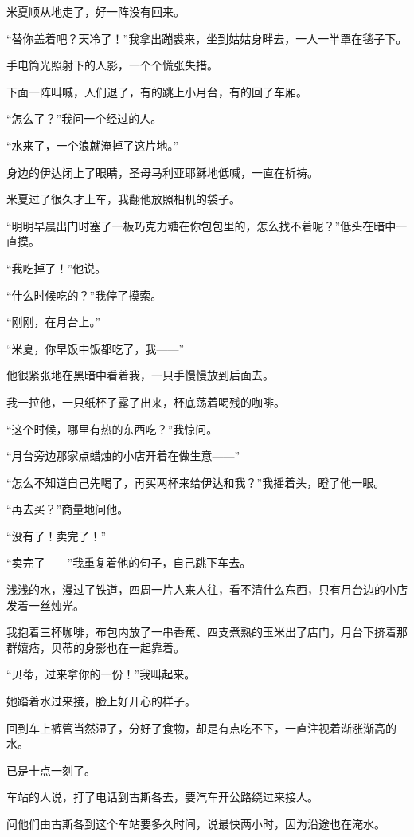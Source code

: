 \par 米夏顺从地走了，好一阵没有回来。
\par “替你盖着吧？天冷了！”我拿出蹦裘来，坐到姑姑身畔去，一人一半罩在毯子下。
\par 手电筒光照射下的人影，一个个慌张失措。
\par 下面一阵叫喊，人们退了，有的跳上小月台，有的回了车厢。
\par “怎么了？”我问一个经过的人。
\par “水来了，一个浪就淹掉了这片地。”
\par 身边的伊达闭上了眼睛，圣母马利亚耶稣地低喊，一直在祈祷。
\par 米夏过了很久才上车，我翻他放照相机的袋子。
\par “明明早晨出门时塞了一板巧克力糖在你包包里的，怎么找不着呢？”低头在暗中一直摸。
\par “我吃掉了！”他说。
\par “什么时候吃的？”我停了摸索。
\par “刚刚，在月台上。”
\par “米夏，你早饭中饭都吃了，我——”
\par 他很紧张地在黑暗中看着我，一只手慢慢放到后面去。
\par 我一拉他，一只纸杯子露了出来，杯底荡着喝残的咖啡。
\par “这个时候，哪里有热的东西吃？”我惊问。
\par “月台旁边那家点蜡烛的小店开着在做生意——”
\par “怎么不知道自己先喝了，再买两杯来给伊达和我？”我摇着头，瞪了他一眼。
\par “再去买？”商量地问他。
\par “没有了！卖完了！”
\par “卖完了——”我重复着他的句子，自己跳下车去。
\par 浅浅的水，漫过了铁道，四周一片人来人往，看不清什么东西，只有月台边的小店发着一丝烛光。
\par 我抱着三杯咖啡，布包内放了一串香蕉、四支煮熟的玉米出了店门，月台下挤着那群嬉痞，贝蒂的身影也在一起靠着。
\par “贝蒂，过来拿你的一份！”我叫起来。
\par 她踏着水过来接，脸上好开心的样子。
\par 回到车上裤管当然湿了，分好了食物，却是有点吃不下，一直注视着渐涨渐高的水。
\par 已是十点一刻了。
\par 车站的人说，打了电话到古斯各去，要汽车开公路绕过来接人。
\par 问他们由古斯各到这个车站要多久时间，说最快两小时，因为沿途也在淹水。
